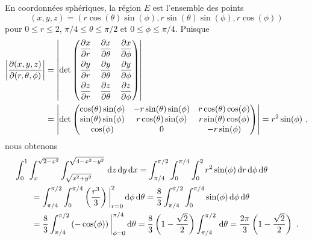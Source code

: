 {En coordonnées sphériques, la région $E$ est l'ensemble des points
\[
(x,y,z) = (r\cos(\theta)\sin(\phi), r\sin(\theta)\sin(\phi), r \cos(\phi))
\]
pour $0 \leq r \leq 2$, $\pi/4 \leq \theta \leq \pi/2$ et
$0 \leq \phi \leq \pi/4$.  Puisque
\begin{align*}
\left| \frac{\partial(x,y,z)}{\partial(r,\theta,\phi)} \right| &= 
\left| \det \begin{pmatrix}
  \displaystyle \frac{\partial x}{\partial r} & \displaystyle \frac{\partial x}{\partial \theta}
  & \displaystyle \frac{\partial x}{\partial \phi} \\[0.8em]
  \displaystyle \frac{\partial y}{\partial r} & \displaystyle \frac{\partial y}{\partial \theta}
  & \displaystyle \frac{\partial y}{\partial \phi} \\[0.8em]
  \displaystyle \frac{\partial z}{\partial r} & \displaystyle \frac{\partial z}{\partial \theta}
  & \displaystyle \frac{\partial z}{\partial \phi}
\end{pmatrix} \right| \\
&= \left| \det \begin{pmatrix}
\cos(\theta)\sin(\phi) & -r \sin(\theta)\sin(\phi) &
 r\cos(\theta)\cos(\phi) \\
 \sin(\theta)\sin(\phi) & r \cos(\theta)\sin(\phi) &
 r\sin(\theta)\cos(\phi) \\
 \cos(\phi) & 0 & -r\sin(\phi)
\end{pmatrix} \right|
= r^2 \sin(\phi) \ ,
\end{align*}
nous obtenons
\begin{align*}
& \int_0^1 \int_x^{\sqrt{2-x^2}}
\int_{\sqrt{x^2+y^2}}^{\sqrt{4-x^2-y^2}} \,\mathrm{d}z\,\mathrm{d}y\,\mathrm{d}x
= \int_{\pi/4}^{\pi/2} \int_0^{\pi/4} \int_0^2  r^2 \sin(\phi) \,\mathrm{d}r \,\mathrm{d}\phi
\,\mathrm{d}\theta \\
&\qquad = \int_{\pi/4}^{\pi/2} \int_0^{\pi/4} \left(
\frac{r^3}{3}\right)\bigg|_{r=0}^2 \,\mathrm{d}\phi \,\mathrm{d}\theta
= \frac{8}{3} \int_{\pi/4}^{\pi/2} \int_0^{\pi/4} \sin(\phi)
\,\mathrm{d}\phi\,\mathrm{d}\theta \\
&\qquad  = \frac{8}{3} \int_{\pi/4}^{\pi/2}
\left(-\cos(\phi)\right)\bigg|_{\phi=0}^{\pi/4} \,\mathrm{d}\theta
= \frac{8}{3}\left(1 - \frac{\sqrt{2}}{2}\right)
\int_{\pi/4}^{\pi/2} \,\mathrm{d}\theta
= \frac{2\pi}{3}\left(1 - \frac{\sqrt{2}}{2}\right) \ .
\end{align*}
}

